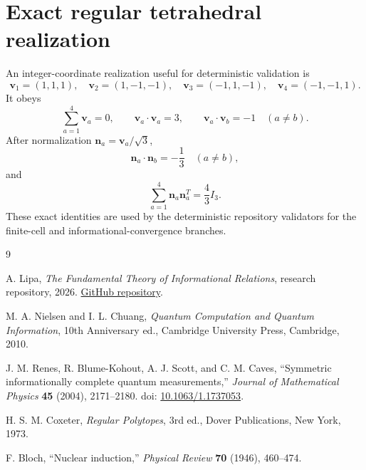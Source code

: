 \documentclass[12pt,a4paper]{article}
\newcommand{\nvec}{\bm{n}}
\newcommand{\vvec}{\bm{v}}
\begin{document}
\section{Exact regular tetrahedral realization}

An integer-coordinate realization useful for deterministic validation is
\[
\vvec_1=(1,1,1),\quad
\vvec_2=(1,-1,-1),\quad
\vvec_3=(-1,1,-1),\quad
\vvec_4=(-1,-1,1).
\]
It obeys
\[
\sum_{a=1}^{4}\vvec_a=0,
\qquad
\vvec_a\cdot\vvec_a=3,
\qquad
\vvec_a\cdot\vvec_b=-1\quad(a\neq b).
\]
After normalization $\nvec_a=\vvec_a/\sqrt3$,
\[
\nvec_a\cdot\nvec_b=-\frac13\quad(a\neq b),
\]
and
\[
\sum_{a=1}^{4}\nvec_a\nvec_a^T=\frac43I_3.
\]
These exact identities are used by the deterministic repository validators for the finite-cell and informational-convergence branches.

\begin{thebibliography}{9}

A. Lipa,
\emph{The Fundamental Theory of Informational Relations},
research repository, 2026.
\newblock \href{https://github.com/AdrianLipa90/The-Fundamental-Theory-of-Informational-Relations}{GitHub repository}.

M. A. Nielsen and I. L. Chuang,
\emph{Quantum Computation and Quantum Information},
10th Anniversary ed., Cambridge University Press, Cambridge, 2010.

J. M. Renes, R. Blume-Kohout, A. J. Scott, and C. M. Caves,
``Symmetric informationally complete quantum measurements,''
\emph{Journal of Mathematical Physics} \textbf{45} (2004), 2171--2180.
\newblock doi: \href{https://doi.org/10.1063/1.1737053}{10.1063/1.1737053}.

H. S. M. Coxeter,
\emph{Regular Polytopes}, 3rd ed.,
Dover Publications, New York, 1973.

F. Bloch,
``Nuclear induction,''
\emph{Physical Review} \textbf{70} (1946), 460--474.

\end{thebibliography}
\end{document}
